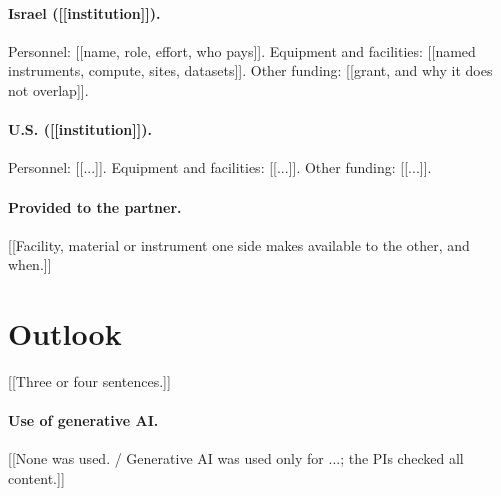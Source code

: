 \documentclass[12pt,a4paper]{article}
\begin{document}
\paragraph{Israel ([[institution]]).} Personnel: [[name, role, effort, who pays]]. Equipment
and facilities: [[named instruments, compute, sites, datasets]]. Other funding: [[grant, and
why it does not overlap]].

\paragraph{U.S. ([[institution]]).} Personnel: [[...]]. Equipment and facilities: [[...]].
Other funding: [[...]].

\paragraph{Provided to the partner.} [[Facility, material or instrument one side makes
available to the other, and when.]]

\section*{Outlook}
[[Three or four sentences.]]

\paragraph{Use of generative AI.} [[None was used. / Generative AI was used only for ...;
the PIs checked all content.]]

% 
% 
\end{document}
